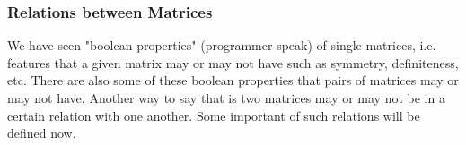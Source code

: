 

\subsubsection{Relations between Matrices}
We have seen "boolean properties" (programmer speak) of single matrices, i.e. features that a given matrix may or may not have such as symmetry, definiteness, etc. There are also some of these boolean properties that pairs of matrices may or may not have. Another way to say that is two matrices may or may not be in a certain relation with one another. Some important of such relations will be defined now.


